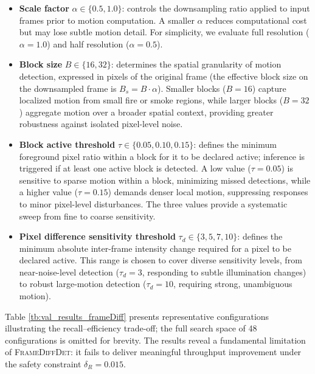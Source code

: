 \documentclass[
  10pt,
]{article}
\begin{document}
\begin{itemize}
\item
  \textbf{Scale factor} \(\alpha \in \{0.5, 1.0\}\): controls the
  downsampling ratio applied to input frames prior to motion
  computation. A smaller \(\alpha\) reduces computational cost but may
  lose subtle motion detail. For simplicity, we evaluate full resolution
  (\(\alpha = 1.0\)) and half resolution (\(\alpha =
  0.5\)).
\item
  \textbf{Block size} \(B \in \{16, 32\}\): determines the spatial
  granularity of motion detection, expressed in pixels of the original
  frame (the effective block size on the downsampled frame is
  \(B_s = B \cdot \alpha\)). Smaller blocks (\(B = 16\)) capture
  localized motion from small fire or smoke regions, while larger blocks
  (\(B = 32\)) aggregate motion over a broader spatial context,
  providing greater robustness against isolated pixel-level noise.
\item
  \textbf{Block active threshold} \(\tau \in \{0.05, 0.10, 0.15\}\):
  defines the minimum foreground pixel ratio within a block for it to be
  declared active; inference is triggered if at least one active block
  is detected. A low value (\(\tau = 0.05\)) is sensitive to sparse
  motion within a block, minimizing missed detections, while a higher
  value (\(\tau = 0.15\)) demands denser local motion, suppressing
  responses to minor pixel-level disturbances. The three values provide
  a systematic sweep from fine to coarse sensitivity.
\item
  \textbf{Pixel difference sensitivity threshold}
  \(\tau_d \in \{3, 5, 7, 10\}\): defines the minimum absolute
  inter-frame intensity change required for a pixel to be declared
  active. This range is chosen to cover diverse sensitivity levels, from
  near-noise-level detection (\(\tau_d = 3\), responding to subtle
  illumination changes) to robust large-motion detection
  (\(\tau_d = 10\), requiring strong, unambiguous motion).
\end{itemize}



Table \ref{tb:val_results_frameDiff} presents representative
configurations illustrating the recall--efficiency trade-off; the full
search space of 48 configurations is omitted for brevity. The results
reveal a fundamental limitation of \textsc{FrameDiffDet}: it fails to
deliver meaningful throughput improvement under the safety constraint
\(\delta_R = 0.015\).
\end{document}
